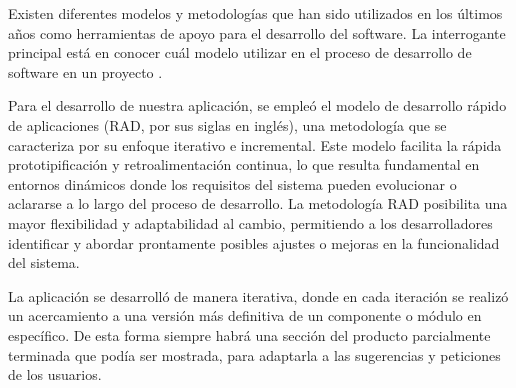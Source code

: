 Existen diferentes modelos y metodologías que han sido utilizados en los últimos años como herramientas de apoyo para el desarrollo del software. La interrogante principal está en conocer cuál modelo utilizar en el proceso de desarrollo de software en un proyecto \cite{DELGADOOLIVERA2021}.

Para el desarrollo de nuestra aplicación, se empleó el modelo de desarrollo rápido de aplicaciones (RAD, por sus siglas en inglés), una metodología que se caracteriza por su enfoque iterativo e incremental. Este modelo facilita la rápida prototipificación y retroalimentación continua, lo que resulta fundamental en entornos dinámicos donde los requisitos del sistema pueden evolucionar o aclararse a lo largo del proceso de desarrollo. La metodología RAD posibilita una mayor flexibilidad y adaptabilidad al cambio, permitiendo a los desarrolladores identificar y abordar prontamente posibles ajustes o mejoras en la funcionalidad del sistema. 

La aplicación se desarrolló de manera iterativa, donde en cada iteración se realizó un acercamiento a una versión más definitiva de un componente o módulo en específico. De esta forma siempre habrá una sección del producto parcialmente terminada que podía ser mostrada, para adaptarla a las sugerencias y peticiones de los usuarios.